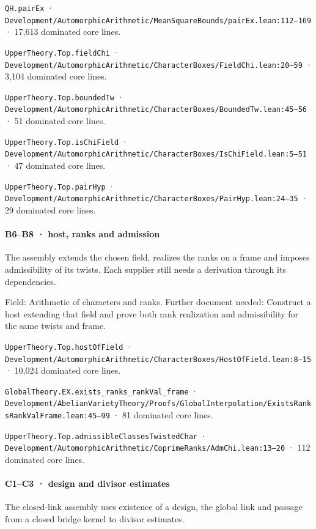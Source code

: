 \nolinkurl{QH.pairEx} · \nolinkurl{Development/AutomorphicArithmetic/MeanSquareBounds/pairEx.lean:112–169} · 17,613 dominated core lines.

\nolinkurl{UpperTheory.Top.fieldChi} · \nolinkurl{Development/AutomorphicArithmetic/CharacterBoxes/FieldChi.lean:20–59} · 3,104 dominated core lines.

\nolinkurl{UpperTheory.Top.boundedTw} · \nolinkurl{Development/AutomorphicArithmetic/CharacterBoxes/BoundedTw.lean:45–56} · 51 dominated core lines.

\nolinkurl{UpperTheory.Top.isChiField} · \nolinkurl{Development/AutomorphicArithmetic/CharacterBoxes/IsChiField.lean:5–51} · 47 dominated core lines.

\nolinkurl{UpperTheory.Top.pairHyp} · \nolinkurl{Development/AutomorphicArithmetic/CharacterBoxes/PairHyp.lean:24–35} · 29 dominated core lines.

\paragraph{B6–B8 · host, ranks and admission}

The assembly extends the chosen field, realizes the ranks on a frame and imposes admissibility of its twists. Each supplier still needs a derivation through its dependencies.

Field: Arithmetic of characters and ranks. Further document needed: Construct a host extending that field and prove both rank realization and admissibility for the same twists and frame.

\nolinkurl{UpperTheory.Top.hostOfField} · \nolinkurl{Development/AutomorphicArithmetic/CharacterBoxes/HostOfField.lean:8–15} · 10,024 dominated core lines.

\nolinkurl{GlobalTheory.EX.exists_ranks_rankVal_frame} · \nolinkurl{Development/AbelianVarietyTheory/Proofs/GlobalInterpolation/ExistsRanksRankValFrame.lean:45–99} · 81 dominated core lines.

\nolinkurl{UpperTheory.Top.admissibleClassesTwistedChar} · \nolinkurl{Development/AutomorphicArithmetic/CoprimeRanks/AdmChi.lean:13–20} · 112 dominated core lines.

\paragraph{C1–C3 · design and divisor estimates}

The closed-link assembly uses existence of a design, the global link and passage from a closed bridge kernel to divisor estimates.

